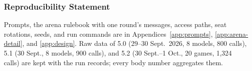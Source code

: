 






\subsubsection*{Reproducibility Statement}
Prompts, the arena rulebook with one round's messages, access paths, seat rotations, seeds, and run commands are in Appendices~\ref{app:prompts}, \ref{app:arena-detail}, and \ref{app:design}. Raw data of 5.0 (29--30 Sept.\ 2026, 8 models, 800 calls), 5.1 (30 Sept., 8 models, 900 calls), and 5.2 (30 Sept.--1 Oct., 20 games, 1,324 calls) are kept with the run records; every body number aggregates them.

\clearpage



\clearpage
\appendix

